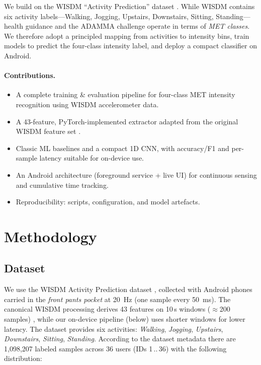 \documentclass[10pt,twocolumn]{article}
\begin{document}
We build on the WISDM ``Activity Prediction'' dataset \cite{Kwapisz2010,wisdm_site}. While WISDM contains six activity labels---Walking, Jogging, Upstairs, Downstairs, Sitting, Standing---health guidance and the ADAMMA challenge operate in terms of \emph{MET classes}. We therefore adopt a principled mapping from activities to intensity bins, train models to predict the four-class intensity label, and deploy a compact classifier on Android.

\paragraph{Contributions.}
\begin{itemize}
  \item A complete training \& evaluation pipeline for four-class MET intensity recognition using WISDM accelerometer data.
  \item A 43-feature, PyTorch-implemented extractor adapted from the original WISDM feature set \cite{Kwapisz2010}.
  \item Classic ML baselines and a compact 1D CNN, with accuracy/F1 and per-sample latency suitable for on-device use.
  \item An Android architecture (foreground service + live UI) for continuous sensing and cumulative time tracking.
  \item Reproducibility: scripts, configuration, and model artefacts.
\end{itemize}

\section{Methodology}
\subsection{Dataset}
We use the WISDM Activity Prediction dataset \cite{wisdm_site}, collected with Android phones carried in the \emph{front pants pocket} at \SI{20}{Hz} (one sample every \SI{50}{ms}). The canonical WISDM processing derives 43 features on 10\,s windows (\(\approx\)200 samples) \cite{Kwapisz2010}, while our on-device pipeline (below) uses shorter windows for lower latency. The dataset provides six activities: \emph{Walking}, \emph{Jogging}, \emph{Upstairs}, \emph{Downstairs}, \emph{Sitting}, \emph{Standing}. According to the dataset metadata there are 1{,}098{,}207 labeled samples across 36 users (IDs 1\,..\,36) with the following distribution:
\end{document}
